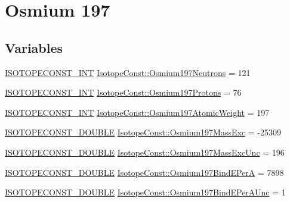 \hypertarget{group___isotope_const-_osmium-_os197}{}\section{Osmium 197}
\label{group___isotope_const-_osmium-_os197}
\subsection*{Variables}
\begin{DoxyCompactItemize}
\item 
\mbox{\hyperlink{group___isotope_const-_macros_ga5f18360b3e99483a35c32d789e62621c}{I\+S\+O\+T\+O\+P\+E\+C\+O\+N\+S\+T\+\_\+\+I\+NT}} \mbox{\hyperlink{group___isotope_const-_osmium-_os197_ga8fd449f7069f2b6e39bfe94a1b9f26d5}{Isotope\+Const\+::\+Osmium197\+Neutrons}} = 121
\item 
\mbox{\hyperlink{group___isotope_const-_macros_ga5f18360b3e99483a35c32d789e62621c}{I\+S\+O\+T\+O\+P\+E\+C\+O\+N\+S\+T\+\_\+\+I\+NT}} \mbox{\hyperlink{group___isotope_const-_osmium-_os197_ga89cab8aad4ee164ebedf38b4e435d07c}{Isotope\+Const\+::\+Osmium197\+Protons}} = 76
\item 
\mbox{\hyperlink{group___isotope_const-_macros_ga5f18360b3e99483a35c32d789e62621c}{I\+S\+O\+T\+O\+P\+E\+C\+O\+N\+S\+T\+\_\+\+I\+NT}} \mbox{\hyperlink{group___isotope_const-_osmium-_os197_ga78cd9b36d1f8343f8c96348981f68de3}{Isotope\+Const\+::\+Osmium197\+Atomic\+Weight}} = 197
\item 
\mbox{\hyperlink{group___isotope_const-_macros_ga8f45a7272ce02c0b4c65c44636ed719a}{I\+S\+O\+T\+O\+P\+E\+C\+O\+N\+S\+T\+\_\+\+D\+O\+U\+B\+LE}} \mbox{\hyperlink{group___isotope_const-_osmium-_os197_gae905a786ff3c61c3c16f6eb4416befa5}{Isotope\+Const\+::\+Osmium197\+Mass\+Exc}} = -\/25309
\item 
\mbox{\hyperlink{group___isotope_const-_macros_ga8f45a7272ce02c0b4c65c44636ed719a}{I\+S\+O\+T\+O\+P\+E\+C\+O\+N\+S\+T\+\_\+\+D\+O\+U\+B\+LE}} \mbox{\hyperlink{group___isotope_const-_osmium-_os197_ga3feaad64c298f744defcb59bf72c892f}{Isotope\+Const\+::\+Osmium197\+Mass\+Exc\+Unc}} = 196
\item 
\mbox{\hyperlink{group___isotope_const-_macros_ga8f45a7272ce02c0b4c65c44636ed719a}{I\+S\+O\+T\+O\+P\+E\+C\+O\+N\+S\+T\+\_\+\+D\+O\+U\+B\+LE}} \mbox{\hyperlink{group___isotope_const-_osmium-_os197_gaa8b53211ff8d8b06ae97dc21274fe7f3}{Isotope\+Const\+::\+Osmium197\+Bind\+E\+PerA}} = 7898
\item 
\mbox{\hyperlink{group___isotope_const-_macros_ga8f45a7272ce02c0b4c65c44636ed719a}{I\+S\+O\+T\+O\+P\+E\+C\+O\+N\+S\+T\+\_\+\+D\+O\+U\+B\+LE}} \mbox{\hyperlink{group___isotope_const-_osmium-_os197_ga59d4374d4c52e8a5a8008a68ed5dde55}{Isotope\+Const\+::\+Osmium197\+Bind\+E\+Per\+A\+Unc}} = 1

\end{DoxyCompactItemize}
